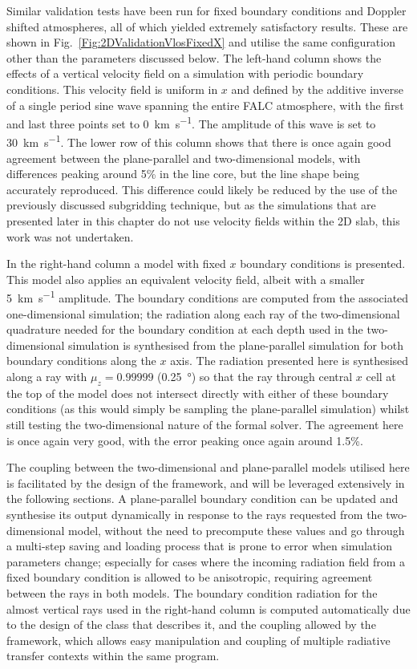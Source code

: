 Similar validation tests have been run for fixed boundary conditions and Doppler shifted atmospheres, all of which yielded extremely satisfactory results.
These are shown in Fig.~\ref{Fig:2DValidationVlosFixedX} and utilise the same configuration other than the parameters discussed below.
The left-hand column shows the effects of a vertical velocity field on a simulation with periodic boundary conditions.
This velocity field is uniform in $x$ and defined by the additive inverse of a single period sine wave spanning the entire FALC atmosphere, with the first and last three points set to \SI{0}{\kilo\metre\per\second}.
The amplitude of this wave is set to \SI{30}{\kilo\metre\per\second}.
The lower row of this column shows that there is once again good agreement between the plane-parallel and two-dimensional models, with differences peaking around 5\% in the line core, but the line shape being accurately reproduced.
This difference could likely be reduced by the use of the previously discussed subgridding technique, but as the simulations that are presented later in this chapter do not use velocity fields within the 2D slab, this work was not undertaken.

In the right-hand column a model with fixed $x$ boundary conditions is presented.
This model also applies an equivalent velocity field, albeit with a smaller \SI{5}{\kilo\metre\per\second} amplitude.
The boundary conditions are computed from the associated one-dimensional simulation; the radiation along each ray of the two-dimensional quadrature needed for the boundary condition at each depth used in the two-dimensional simulation is synthesised from the plane-parallel simulation for both boundary conditions along the $x$ axis.
The radiation presented here is synthesised along a ray with $\mu_z=0.99999$ (\SI{0.25}{\degree}) so that the ray through central $x$ cell at the top of the model does not intersect directly with either of these boundary conditions (as this would simply be sampling the plane-parallel simulation) whilst still testing the two-dimensional nature of the formal solver.
The agreement here is once again very good, with the error peaking once again around 1.5\%.

The coupling between the two-dimensional and plane-parallel models utilised here is facilitated by the design of the \Lw{} framework, and will be leveraged extensively in the following sections.
A plane-parallel boundary condition can be updated and synthesise its output dynamically in response to the rays requested from the two-dimensional model, without the need to precompute these values and go through a multi-step saving and loading process that is prone to error when simulation parameters change; especially for cases where the incoming radiation field from a fixed boundary condition is allowed to be anisotropic, requiring agreement between the rays in both models.
The boundary condition radiation for the almost vertical rays used in the right-hand column is computed automatically due to the design of the class that describes it, and the coupling allowed by the framework, which allows easy manipulation and coupling of multiple radiative transfer contexts within the same program.

